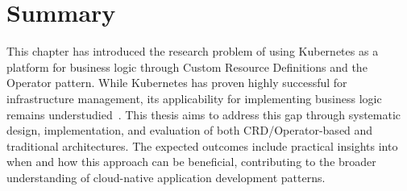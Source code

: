 \section{Summary}

This chapter has introduced the research problem of using Kubernetes as a platform for business logic through Custom Resource Definitions and the Operator pattern. While Kubernetes has proven highly successful for infrastructure management, its applicability for implementing business logic remains understudied~\cite{kubernetes_multivocal_review}. This thesis aims to address this gap through systematic design, implementation, and evaluation of both CRD/Operator-based and traditional architectures. The expected outcomes include practical insights into when and how this approach can be beneficial, contributing to the broader understanding of cloud-native application development patterns.
